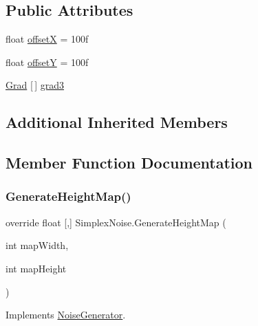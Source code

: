 \subsection*{Public Attributes}
\begin{DoxyCompactItemize}
\item 
float \mbox{\hyperlink{class_simplex_noise_aa55bdc3da38443283d578a7eda4987e3}{offsetX}} = 100f
\item 
float \mbox{\hyperlink{class_simplex_noise_ae0fcfbb7ecbb42049f0d80b93a002c10}{offsetY}} = 100f
\item 
\mbox{\hyperlink{class_simplex_noise_1_1_grad}{Grad}} \mbox{[}$\,$\mbox{]} \mbox{\hyperlink{class_simplex_noise_a061de88e8e944eda8e5823a7e4dc7560}{grad3}}
\end{DoxyCompactItemize}
\subsection*{Additional Inherited Members}


\subsection{Member Function Documentation}
\mbox{\label{class_simplex_noise_aea5b04e1455da3c6eb8b29deb28a239c}} 
\subsubsection{\texorpdfstring{Generate\+Height\+Map()}{GenerateHeightMap()}}
{\footnotesize\ttfamily override float \mbox{[},\mbox{]} Simplex\+Noise.\+Generate\+Height\+Map (\begin{DoxyParamCaption}\item[{int}]{map\+Width,  }\item[{int}]{map\+Height }\end{DoxyParamCaption})\hspace{0.3cm}{\ttfamily [virtual]}}



Implements \mbox{\hyperlink{class_noise_generator_a1d3983a9ad33c2734f373e9f2d8f13d7}{Noise\+Generator}}.

\mbox{\label{class_simplex_noise_a616d1987674e90392904a65c7618c9d4}} 
